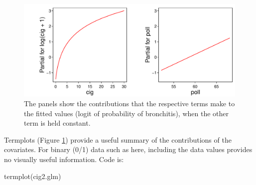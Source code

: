 \documentclass{tufte-book}\usepackage[]{graphicx}\usepackage[]{color}
\begin{document}
\begin{figure}[h]
\begin{Schunk}


\centerline{\includegraphics[width=\textwidth]{figs/8-cig2-tplot-1} }

\end{Schunk}
\caption{The panels show the contributions that the respective terms
  make to the fitted values (logit of probability of bronchitis), when
  the other term is held constant.\label{fig:xy-cig}}
\end{figure}

Termplots (Figure \ref{fig:xy-cig}) provide a useful summary of the
contributions of the covariates.  For binary (0/1) data such as here,
including the data values provides no visually useful information.
Code is:
\begin{Schunk}
\begin{Sinput}
termplot(cig2.glm)
\end{Sinput}
\end{Schunk}
\end{document}
